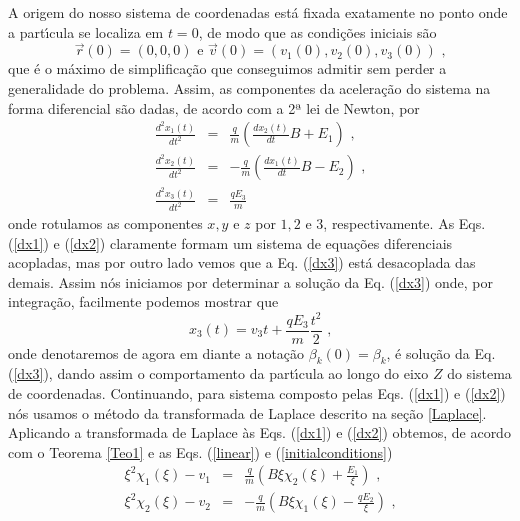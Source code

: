 \documentclass[twocolumn]{rbef}
\newcommand{\1}{\mathbbm{1}}
\begin{document}
A origem do nosso sistema de coordenadas est\'{a} fixada exatamente no
ponto onde a part\'{\i}cula se localiza em $t=0 $, de modo que as
condi\c{c}\~{o}es iniciais são
\begin{equation}
  \vec{r}\left(
    0\right) =\left( 0,0,0\right) \text { \ e \ } \vec{v}\left( 0\right) =\left(v_{1}(0) ,v_{2}(0) ,v_{3}(0) \right) \text{ ,} \label{initialconditions}
\end{equation}
que é o m\'{a}ximo de simplifica\c{c}\~{a}o que conseguimos admitir sem
perder a generalidade do problema. Assim, as componentes da
acelera\c{c}\~{a}o do sistema na forma diferencial s\~{a}o dadas, de
acordo com a 2ª lei de Newton, por%
\begin{eqnarray}
  \frac{d^{2}x_{1}\left( t\right) }{dt^{2}} &=&\frac{q}{m} \left( \frac{dx_{2}\left(
                                                t\right) }{dt}B+E_{1} \right) \label{dx1} \text{ ,} \\
  \frac{d^{2}x_{2}\left( t\right) }{dt^{2}} &=&-\frac{q}{m} \left( \frac{dx_{1}\left(
                                                t\right) }{dt}B-E_{2} \right) \label{dx2} \text{ ,} \\
  \frac{d^{2}x_{3}\left( t\right) }{dt^{2}} &=&\frac{qE_{3}}{m}  \label{dx3}
\end{eqnarray}%
onde rotulamos as componentes $x,y$ e $z$ por $1,2$ e $3$,
respectivamente.  As Eqs. (\ref{dx1}) e (\ref{dx2}) claramente formam um
sistema de equa\c{c}\~{o}es diferenciais acopladas, mas por outro lado
vemos que a Eq. (\ref{dx3}) est\'{a} desacoplada das demais. Assim
n\'{o}s iniciamos por determinar a solu\c{c}\~{a}o da Eq. (\ref{dx3})
onde, por integração, facilmente podemos mostrar que%
\begin{equation}
  x_{3}\left( t\right) = v_{3} t+\frac{qE_{3}}{m}%
  \frac{t^{2}}{2} \text{ ,} \label{x3}
\end{equation}%
onde denotaremos de agora em diante a notação $\beta_{k}(0)=\beta_{k}$,
\'{e} solu\c{c}\~{a}o da Eq. (\ref{dx3}), dando assim o comportamento da
part\'{\i}cula ao longo do eixo $Z$ do sistema de
coordenadas. Continuando, para sistema composto pelas Eqs. (\ref{dx1}) e
(\ref{dx2}) n\'{o}s usamos o método da transformada de Laplace descrito
na seção \ref{Laplace}. Aplicando a transformada de Laplace às
Eqs. (\ref{dx1}) e (\ref{dx2}) obtemos, de acordo com o Teorema
\ref{Teo1} e as Eqs. (\ref{linear}) e (\ref{initialconditions})
\begin{eqnarray}
  \xi^{2}\chi _{1}\left( \xi\right) -v_{1}  &=&\frac{q}{m}%
                                                \left( B\xi\chi _{2}\left( \xi\right) +\frac{E_{1}}{\xi} \right) \text{ ,} \\
  \xi^{2}\chi _{2}\left( \xi\right) -v_{2}  &=&-\frac{q}{m}%
                                                \left( B\xi\chi _{1}\left( \xi\right) - \frac{qE_{2}}{\xi} \right) \text{ ,}
\end{eqnarray}%
\end{document}
